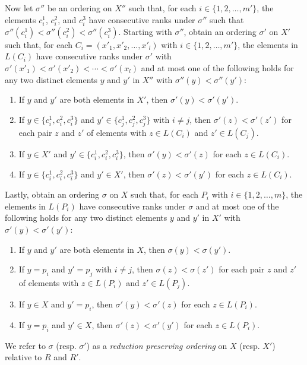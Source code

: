 \documentclass{article}
\begin{document}
Now let $\sigma''$ be an ordering on $X''$ such that, for each $i\in\{1,2,\ldots,m'\}$, the elements $c_i^1$, $c_i^2$, and $c_i^3$ have consecutive ranks under $\sigma''$ such that $\sigma''(c_i^1) < \sigma''(c_i^2) < \sigma''(c_i^3)$. 
Starting with $\sigma''$, obtain an ordering $\sigma'$ on $X'$ such that, for each $C_i=(x'_1,x'_2,\ldots,x'_l)$ with $i\in\{1,2,\ldots,m'\}$, the elements in $L(C_i)$ have consecutive ranks under $\sigma'$ with $\sigma'(x'_1)<\sigma'(x'_2)<\cdots < \sigma'(x_l)$ and at most one of the following holds for any two distinct elements $y$ and $y'$ in $X''$ with $\sigma''(y)<\sigma''(y')$:
\begin{enumerate}
    \itemsep 0pt
    \item If $y$ and $y'$ are both elements in $X'$, then $\sigma'(y)<\sigma'(y')$.
    \item If $y\in \{c^1_i, c^2_i, c^3_i\}$ and  $y'\in \{c^1_j, c^2_j, c^3_j\}$ with $i\ne j$, then $\sigma'(z)<\sigma'(z')$ for each pair $z$ and $z'$ of elements with $z\in L(C_i)$ and $z'\in L(C_j)$.
    \item If $y\in X'$ and $y'\in \{c^1_i, c^2_i, c^3_i\}$, then $\sigma'(y)<\sigma'(z)$ for each $z\in L(C_i)$.
    \item If $y\in \{c^1_i, c^2_i, c^3_i\}$ and $y'\in X'$, then $\sigma'(z)<\sigma'(y')$ for each $z\in L(C_i)$.
\end{enumerate} 
\noindent Lastly, obtain an ordering $\sigma$ on $X$ such that, for each $P_i$ with $i\in\{1,2,\ldots,m\}$, the elements in $L(P_i)$ have consecutive ranks under $\sigma$ and at most one of the following holds for any two distinct elements $y$ and $y'$ in $X'$ with $\sigma'(y)<\sigma'(y')$:
\begin{enumerate}
    \itemsep 0pt
    \item If $y$ and $y'$ are both elements in $X$, then $\sigma(y)<\sigma(y')$.
    \item If $y=p_i$ and  $y'=p_j$ with $i\ne j$, then $\sigma(z)<\sigma(z')$ for each pair $z$ and $z'$ of elements with $z\in L(P_i)$ and $z'\in L(P_j)$.
    \item If $y\in X$ and $y'=p_i$, then $\sigma'(y)<\sigma'(z)$ for each $z\in L(P_i)$.
    \item If $y=p_i$ and $y'\in X$, then $\sigma'(z)<\sigma'(y')$ for each $z\in L(P_i)$.
\end{enumerate} 
We refer to $\sigma$ (resp. $\sigma'$) as a {\em reduction preserving ordering} on $X$ (resp. $X'$) relative to $R$ and $R'$. 
\end{document}
